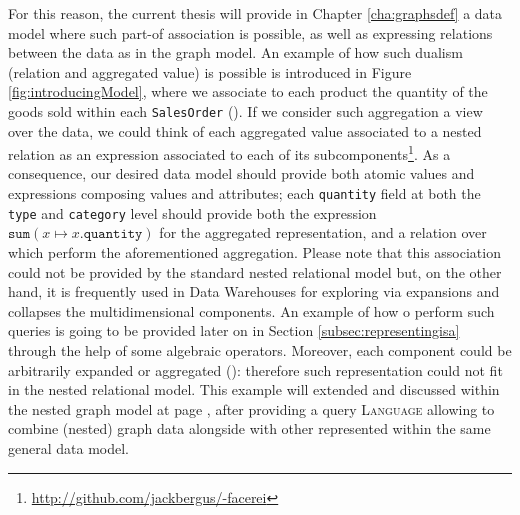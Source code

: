 \begin{example}[label=ex:inaggr]
For this reason, the current thesis will provide in Chapter \ref{cha:graphsdef} a data model where such part-of association is possible, as well as expressing relations between the data as in the graph model. An example of how such dualism (relation and aggregated value) is possible is introduced in Figure \vref{fig:introducingModel}, where we associate to each product the quantity of the goods sold within each \texttt{SalesOrder} (). If we consider such aggregation a view over the data, we could think of each aggregated value associated to a nested relation as an expression associated to each of its subcomponents\footnote{\url{http://github.com/jackbergus/-facerei}}. As a consequence, our desired data model should provide both atomic values and expressions composing values and attributes; each \texttt{quantity} field at both the \texttt{type} and \texttt{category} level should provide both the expression $\texttt{sum}(x\mapsto x.\texttt{quantity})$ for the aggregated representation, and a relation over which perform the aforementioned aggregation. Please note that this association could not be provided by the standard nested relational model but, on the other hand, it is frequently used in Data Warehouses for exploring via expansions and collapses the multidimensional components. An example of how o perform such queries is going to be provided later on in Section \vref{subsec:representingisa} through the help of some algebraic operators. Moreover, each component could be arbitrarily expanded or aggregated (): therefore such representation could not fit in the nested relational model. This example will extended and discussed within the nested graph model at page \pageref{ex:firstforgrammars}, after providing a query  \textsc{Language} allowing to combine (nested) graph data alongside with other represented within the same general data model.
\end{example}
